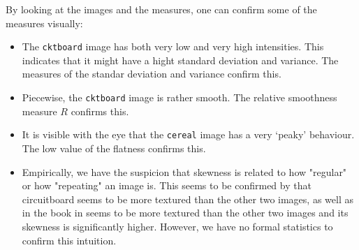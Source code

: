 By looking at the images and the measures, one can confirm some of the measures visually:
\begin{itemize}
	\item
	The \texttt{cktboard} image has both very low and very high intensities.
	This indicates that it might have a hight standard deviation and variance.
	The measures of the standar deviation and variance confirm this.

	\item
	Piecewise, the \texttt{cktboard} image is rather smooth.
	The relative smoothness measure \(R\) confirms this.

	\item
	It is visible with the eye that the \texttt{cereal} image has a very `peaky' behaviour.
	The low value of the flatness confirms this.

	\item
	Empirically, we have the suspicion that skewness is related to how "regular" or how "repeating" an image is. This seems to be confirmed by that circuitboard seems to be more textured than the other two images, as well as in the book in \cite[p. 828, figure 11.28(c)]{gonzalez2002digital} seems to be more textured than the other two images and its skewness is significantly higher. However, we have no formal statistics to confirm this intuition. 
\end{itemize}

\clearpage